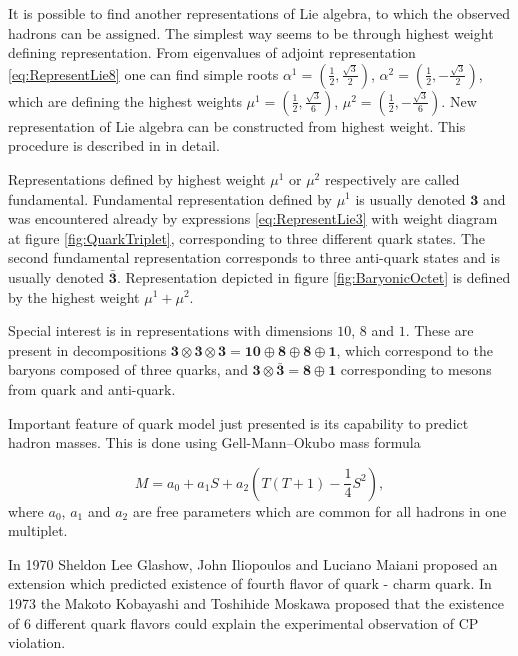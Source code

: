 \documentclass[a4paper,11pt]{report}
\begin{document}
It is possible to find another representations of Lie algebra, to which the
observed hadrons can be assigned. The simplest way seems to be through highest
weight defining representation. From eigenvalues of adjoint representation
\eqref{eq:RepresentLie8} one can find simple roots 
$\alpha^1=\left( \frac{1}{2}, \frac{\sqrt{3}}{2} \right)$, 
$\alpha^2=\left( \frac{1}{2}, - \frac{\sqrt{3}}{2} \right)$, 
which are defining the highest weights 
$\mu^1=\left( \frac{1}{2}, \frac{\sqrt{3}}{6} \right)$, 
$\mu^2=\left( \frac{1}{2}, - \frac{\sqrt{3}}{6} \right)$.
New representation of Lie algebra can be constructed from highest weight. This
procedure is described in \cite{LieAlgebrasForParticlePhysicists} in detail.

Representations defined by highest weight $\mu^1$ or $\mu^2$ respectively are
called fundamental. Fundamental representation defined by $\mu^1$ is usually
denoted $\mathbf{3}$ and was encountered already by expressions
\eqref{eq:RepresentLie3} with weight diagram at figure \ref{fig:QuarkTriplet},
corresponding to three different quark states. The second fundamental
representation corresponds to three anti-quark states and is usually denoted
$\bar{\mathbf{3}}$. Representation depicted in figure \ref{fig:BaryonicOctet} is
defined by the highest weight $\mu^1 + \mu^2$.

Special interest is in representations with dimensions $10$, $8$ and $1$. These
are present in decompositions $\mathbf{3} \otimes \mathbf{3} \otimes
\mathbf{3} = \mathbf{10} \oplus \mathbf{8} \oplus \mathbf{8} \oplus \mathbf{1}$,
which correspond to the baryons composed of three quarks, and $\mathbf{3}
\otimes \bar{\mathbf{3}} = \mathbf{8} \oplus \mathbf{1}$ corresponding to
mesons from quark and anti-quark.

Important feature of quark model just presented is its capability to predict
hadron masses. This is done using Gell-Mann--Okubo mass formula
\cite{Gell-Mann:1250016,Okubo01051962}

\begin{equation}
  M = a_0 + a_1 S + a_2 \left( T(T+1) - \frac{1}{4}S^2 \right),
  \label{eq:GellMannOkubo}
\end{equation}
where $a_0$, $a_1$ and $a_2$ are free parameters which are common for all
hadrons in one multiplet. 

In 1970 Sheldon Lee Glashow, John Iliopoulos and Luciano Maiani proposed
\cite{Quarks4} an extension which predicted existence of fourth flavor of quark
- charm quark.
In 1973 the Makoto Kobayashi and Toshihide Moskawa proposed \cite{Quarks6} that the
existence of 6 different quark flavors could explain the experimental
observation of CP violation.
\end{document}

